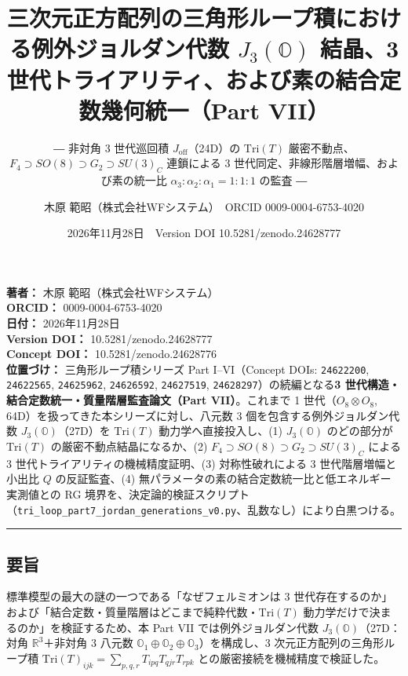 \documentclass[
  a4paper,
]{ltjsarticle}
\title{三次元正方配列の三角形ループ積における例外ジョルダン代数
\(J_3(\mathbb{O})\) 結晶、3
世代トライアリティ、および素の結合定数幾何統一（Part VII）}
\subtitle{― 非対角 3 世代巡回積 \(J_{\mathrm{off}}\)（24D）の
\(\mathrm{Tri}(T)\)
厳密不動点、\(F_4 \supset SO(8) \supset G_2 \supset SU(3)_C\) 連鎖による
3 世代同定、非線形階層増幅、および素の統一比
\(\alpha_3:\alpha_2:\alpha_1 = 1:1:1\) の監査 ―}
\author{木原 範昭（株式会社WFシステム）　ORCID 0009-0004-6753-4020}
\date{2026年11月28日　Version DOI 10.5281/zenodo.24628777}
\begin{document}
\maketitle

{
\setcounter{tocdepth}{2}
\tableofcontents
}
\textbf{著者：} 木原 範昭（株式会社WFシステム）\\
\textbf{ORCID：} 0009-0004-6753-4020\\
\textbf{日付：} 2026年11月28日\\
\textbf{Version DOI：} 10.5281/zenodo.24628777\\
\textbf{Concept DOI：} 10.5281/zenodo.24628776\\
\textbf{位置づけ：} 三角形ループ積シリーズ Part I--VI（Concept DOIs:
\texttt{24622200}, \texttt{24622565}, \texttt{24625962},
\texttt{24626592}, \texttt{24627519},
\texttt{24628297}）の続編となる\textbf{3
世代構造・結合定数統一・質量階層監査論文（Part VII）}。これまで 1
世代（\(O_8 \otimes O_8\), 64D）を扱ってきた本シリーズに対し、八元数 3
個を包含する例外ジョルダン代数 \(J_3(\mathbb{O})\)（27D）を
\(\mathrm{Tri}(T)\) 動力学へ直接投入し、(1) \(J_3(\mathbb{O})\)
のどの部分が \(\mathrm{Tri}(T)\) の厳密不動点結晶になるか、(2)
\(F_4 \supset SO(8) \supset G_2 \supset SU(3)_C\) による 3
世代トライアリティの機械精度証明、(3) 対称性破れによる 3
世代階層増幅と小出比 \(Q\) の反証監査、(4)
無パラメータの素の結合定数統一比と低エネルギー実測値との RG
境界を、決定論的検証スクリプト（\texttt{tri\_loop\_part7\_jordan\_generations\_v0.py}、乱数なし）により白黒つける。

\begin{center}\rule{0.5\linewidth}{0.5pt}\end{center}

\subsection{要旨}\label{ux8981ux65e8}

標準模型の最大の謎の一つである「なぜフェルミオンは 3
世代存在するのか」および「結合定数・質量階層はどこまで純粋代数・\(\mathrm{Tri}(T)\)
動力学だけで決まるのか」を検証するため、本 Part VII
では例外ジョルダン代数 \(J_3(\mathbb{O})\)（27D：対角
\(\mathbb{R}^3\)＋非対角 3 八元数
\(\mathbb{O}_1 \oplus \mathbb{O}_2 \oplus \mathbb{O}_3\)）を構成し、3
次元正方配列の三角形ループ積
\(\mathrm{Tri}(T)_{ijk} = \sum_{p,q,r} T_{ipq} T_{qjr} T_{rpk}\)
との厳密接続を機械精度で検証した。
\end{document}
